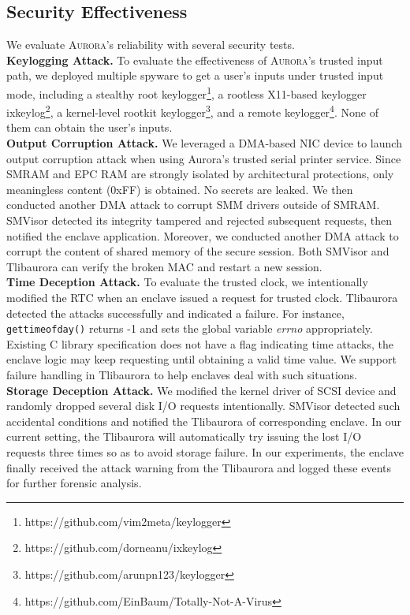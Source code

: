 \documentclass[journal,twocolumn,letterpaper,10pt]{IEEEtran}
\begin{document}
\subsection{Security Effectiveness}\label{security}
We evaluate \textsc{Aurora}'s reliability with several security tests.
\\
\textbf{Keylogging Attack.}
To evaluate the effectiveness of \textsc{Aurora}'s trusted input path, we deployed multiple spyware to get a user's inputs under trusted input mode, including a stealthy root keylogger\footnote{https://github.com/vim2meta/keylogger}, a rootless X11-based keylogger ixkeylog\footnote{https://github.com/dorneanu/ixkeylog}, a kernel-level rootkit keylogger\footnote{https://github.com/arunpn123/keylogger}, and a remote keylogger\footnote{https://github.com/EinBaum/Totally-Not-A-Virus}. None of them can obtain the user's inputs.
\\
\textbf{Output Corruption Attack.}
We leveraged a DMA-based NIC device to launch output corruption attack when using Aurora's trusted serial printer service. Since  SMRAM and EPC RAM are strongly isolated by architectural protections, only meaningless content (0xFF) is obtained. No secrets are leaked. We then conducted another DMA attack to corrupt SMM drivers outside of SMRAM. SMVisor detected its integrity tampered  and rejected subsequent requests, then notified the enclave application. Moreover, we conducted another DMA attack to corrupt the content of shared memory of the secure session. Both SMVisor and Tlibaurora can verify the broken MAC and restart a new session.
\\
\textbf{Time Deception Attack.}
To evaluate the trusted clock, we intentionally modified the RTC when an enclave issued a request for trusted clock. Tlibaurora detected the attacks successfully and indicated a failure. For instance, \texttt{gettimeofday()} returns -1 and sets the global variable \textit{errno} appropriately. Existing C library specification does not have a flag indicating time attacks, the enclave logic may keep requesting until obtaining a valid time value. We support failure handling in Tlibaurora to help enclaves deal with such situations.
\\
\textbf{Storage Deception Attack.}
We modified the kernel driver of SCSI device and randomly dropped several disk I/O requests intentionally.  SMVisor detected such accidental conditions and notified the Tlibaurora of corresponding enclave. In our current setting, the Tlibaurora will automatically try issuing the lost I/O requests three times so as to avoid storage failure. In our experiments, the enclave finally received the attack warning from the Tlibaurora and logged these events for further forensic analysis.
\end{document}
